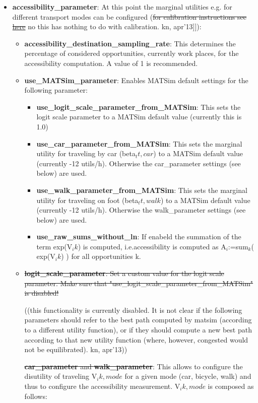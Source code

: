 \begin{itemize}
	\item \textbf{accessibility\_parameter}: At this point the marginal utilities e.g. for different transport modes can be configured (\sout{for calibration instructions see \href{http://www.matsim.org/node/650}{here}} no this has nothing to do with calibration. kn, apr'13]]):   
\begin{itemize}
	\item \textbf{accessibility\_destination\_sampling\_rate}: This  determines the percentage of considered opportunities, currently work  places, for the accessibility computation. A value of 1 is recommended.
	\item \textbf{use\_MATSim\_parameter}: Enables MATSim default settings for the following parameter:     
\begin{itemize}
	\item \textbf{use\_logit\_scale\_parameter\_from\_MATSim}: This sets the logit scale parameter to a MATSim default value (currently this is 1.0)
	\item \textbf{use\_car\_parameter\_from\_MATSim}: This sets the marginal utility for traveling by car (beta$_tt,car$) to a MATSim default value (currently -12 utils/h). Otherwise the car\_parameter settings (see below) are used.
	\item \textbf{use\_walk\_parameter\_from\_MATSim}: This sets the marginal utility for traveling on foot (beta$_tt,walk$) to a MATSim default value (currently -12 utils/h). Otherwise the walk\_parameter settings (see below) are used.
	\item \textbf{use\_raw\_sums\_without\_ln}: If enabeld the summation of the term exp(V$_ik$) is computed, i.e.accessibility is computed as A$_i$:=sum$_k$( exp(V$_ik$) ) for all opportunities k.
\end{itemize}
	\item \sout{\textbf{logit\_scale\_parameter}: Set a custom value for the logit scale parameter. Make sure that "use\_logit\_scale\_parameter\_from\_MATSim" is disabled!}


((this functionality is currently disabled. It is not clear if the  following parameters should refer to the best path computed by matsim  (according to a different utility function), or if they should compute a  new best path according to that new utility function (where, however,  congested would not be equilibrated). kn, apr'13)) 

\sout{\textbf{car\_parameter} and \textbf{walk\_parameter}}: This allows to configure the disutility of traveling V$_ik,mode$ for a given mode (car, bicycle, walk) and thus to configure the accessibility measurement. V$_ik,mode$ is composed as follows:


\end{itemize}
\end{itemize}
